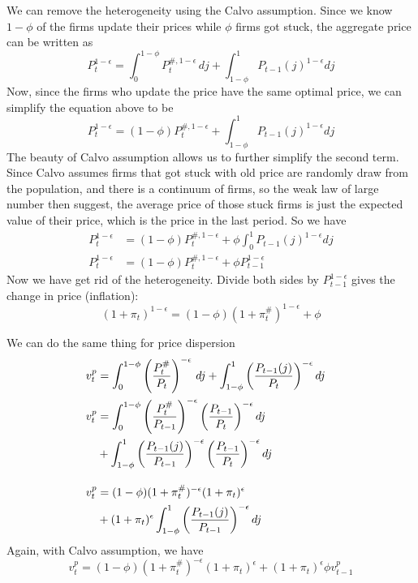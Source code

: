 \documentclass[twocolumn, fleqn]{article}
\begin{document}
	We can remove the heterogeneity using the Calvo assumption. Since we know $1-\phi$ of the firms update their prices while $\phi$ firms got stuck, the aggregate price can be written as
	\[P_t^{1-\epsilon} = \int_{0}^{1-\phi} P_t^{\#,1-\epsilon} \, dj + \int_{1-\phi}^{1} P_{t-1}(j)^{1-\epsilon} dj\]
	Now, since the firms who update the price have the same optimal price, we can simplify the equation above to be
	\[P_t^{1-\epsilon} = (1-\phi) P_t^{\#,1-\epsilon} + \int_{1-\phi}^{1} P_{t-1}(j)^{1-\epsilon}  dj\]
	The beauty of Calvo assumption allows us to further simplify the second term. Since Calvo assumes firms that got stuck with old price are randomly draw from the population, and there is a continuum of firms, so the weak law of large number then suggest, the average price of those stuck firms is just the expected value of their price, which is the price in the last period. So we have 
	\begin{align*}
		P_t^{1-\epsilon} &= (1-\phi) P_t^{\#,1-\epsilon} + \phi \int_{0}^{1} P_{t-1}(j)^{1-\epsilon}  dj\\
		P_t^{1-\epsilon} &= (1-\phi) P_t^{\#,1-\epsilon} + \phi P_{t-1}^{1-\epsilon}
	\end{align*}
	Now we have get rid of the heterogeneity. Divide both sides by $P_{t-1}^{1-\epsilon}$ gives the change in price (inflation):
	\begin{equation}
	(1 + \pi_t)^{1-\epsilon} = (1-\phi) (1 + \pi_t^{\#})^{1-\epsilon} + \phi
	\end{equation}

	We can do the same thing for price dispersion
	\begin{align*}
	\hspace{-28pt} v_t^p &= \int_0^{1-\phi} \left( \frac{P_t^{\#}}{P_t} \right)^{-\epsilon} \, dj + \int_{1-\phi}^1 \left( \frac{P_{t-1}(j)}{P_t} \right)^{-\epsilon} dj \\
	\hspace{-28pt} v_t^p &= \int_0^{1-\phi} \left( \frac{P_t^{\#}}{P_{t-1}} \right)^{-\epsilon} \left( \frac{P_{t-1}}{P_t} \right)^{-\epsilon}  dj\\
	 &+ \int_{1-\phi}^1 \left( \frac{P_{t-1}(j)}{P_{t-1}} \right)^{-\epsilon} \left( \frac{P_{t-1}}{P_t} \right)^{-\epsilon}  dj \\[10pt]
	\hspace{-28pt} v_t^p &= (1-\phi) (1 + \pi_t^{\#})^{-\epsilon} (1 + \pi_t)^\epsilon\\
	& + (1 + \pi_t)^\epsilon \int_{1-\phi}^1 \left( \frac{P_{t-1}(j)}{P_{t-1}} \right)^{-\epsilon}  dj 
	\end{align*}
	Again, with Calvo assumption, we have 
	\begin{equation}
			v_t^p = (1-\phi) (1 + \pi_t^{\#})^{-\epsilon} (1 + \pi_t)^\epsilon + (1 + \pi_t)^\epsilon \phi v_{t-1}^p
	\end{equation}
	
\end{document}
